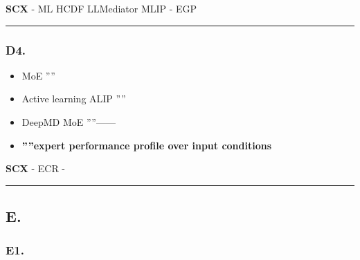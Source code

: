 \documentclass[
  12pt,
]{article}
\providecommand{\tightlist}{%
  \setlength{\itemsep}{0pt}\setlength{\parskip}{0pt}}
\begin{document}
\textbf{SCX } -  ML  HCDF
LLMediator  MLIP  -
 EGP 

\begin{center}\rule{0.5\linewidth}{0.5pt}\end{center}

\subsubsection{D4.
}\label{d4.-ux591aux4e13ux5bb6ux6027ux80fdux7684ux8f93ux5165ux6761ux4ef6ux4f9dux8d56}

\textbf{}

\begin{itemize}
\tightlist
\item
  MoE
  \textbf{}''''
\item
  Active learning  ALIP
  ''''
\item
  DeepMD MoE
  ''''------
\item
  \textbf{''''expert performance
  profile over input conditions}
\end{itemize}

\textbf{SCX } - ECR
 -


\begin{center}\rule{0.5\linewidth}{0.5pt}\end{center}

\subsection{E.
}\label{e.-ux7adeux4e89ux683cux5c40ux603bux7ed3ux4e0eux6218ux7565ux5efaux8bae}

\subsubsection{E1.
}\label{e1.-ux521bux65b0ux7ef4ux5ea6ux5bf9ux6bd4ux77e9ux9635}
\end{document}
